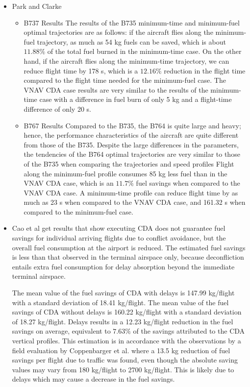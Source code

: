 \documentclass{aer1315-pretty}
\begin{document}
\begin{itemize}

\item Park and Clarke \cite{Park:2015} 

\begin{itemize}
\item B737 Results
The results of the B735 minimum-time and minimum-fuel optimal trajectories are as follows: if the aircraft flies along the minimum-fuel trajectory, as much as 54 kg fuels can be saved, which is about $11.88\%$ of the total fuel burned in the minimum-time case. On the other hand, if the aircraft flies along the minimum-time trajectory, we can reduce flight time by 178 s, which is a $12.16\%$ reduction in the flight time compared to the flight time needed for the minimum-fuel case. The VNAV CDA case results are
very similar to the results of the minimum-time case with a difference in fuel burn of only 5 kg and a flight-time difference of only 20 s.

\item B767 Results
Compared to the B735, the B764 is quite large and heavy; hence, the performance characteristics of the aircraft are quite different from those of the B735. Despite the large differences in the parameters, the tendencies of the B764 optimal trajectories are very similar to those of the B735 when comparing the trajectories and speed profiles  Flight along the minimum-fuel profile consumes 85 kg less fuel than in the VNAV CDA case, which is an $11.7\%$ fuel savings when compared to the VNAV CDA case. A minimum-time profile can reduce flight time by as much as 23 s when compared to the VNAV CDA case, and 161.32 s when compared to the minimum-fuel case.
\end{itemize}


\item Cao et al \cite{Cao:2013} get results that show executing CDA does not guarantee fuel savings for individual arriving flights due to conflict avoidance, but the overall fuel consumption at the airport is reduced. The estimated fuel savings is less than that observed in the terminal airspace only, because deconfliction entails extra fuel consumption for delay absorption beyond the immediate terminal airspace.

The mean value of the fuel savings of CDA with delays is 147.99 kg/flight with a standard deviation of 18.41 kg/flight. The mean value of the fuel savings of CDA without delays is 160.22 kg/flight with a standard deviation of 18.27 kg/flight. Delays results in a 12.23 kg/flight reduction in the fuel savings on average, equivalent to $7.63\%$ of the savings attributed to the CDA vertical profiles. This estimation is in accordance with the observations by a field evaluation by Coppenbarger et al.
where a 13.5 kg reduction of fuel savings per flight due to traffic was found, even though the absolute saving values may vary from 180 kg/flight to 2700 kg/flight.
This is likely due to delays which may cause a decrease in the fuel savings.


\end{itemize}
\end{document}
